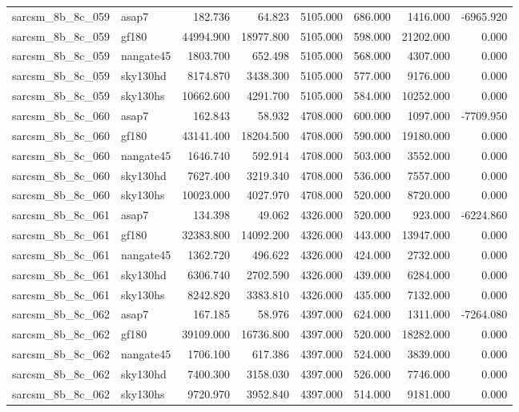 \begin{tabular}{llrrrrrr}
sarcsm\_8b\_8c\_059 & asap7 & 182.736 & 64.823 & 5105.000 & 686.000 & 1416.000 & -6965.920 \\
sarcsm\_8b\_8c\_059 & gf180 & 44994.900 & 18977.800 & 5105.000 & 598.000 & 21202.000 & 0.000 \\
sarcsm\_8b\_8c\_059 & nangate45 & 1803.700 & 652.498 & 5105.000 & 568.000 & 4307.000 & 0.000 \\
sarcsm\_8b\_8c\_059 & sky130hd & 8174.870 & 3438.300 & 5105.000 & 577.000 & 9176.000 & 0.000 \\
sarcsm\_8b\_8c\_059 & sky130hs & 10662.600 & 4291.700 & 5105.000 & 584.000 & 10252.000 & 0.000 \\
sarcsm\_8b\_8c\_060 & asap7 & 162.843 & 58.932 & 4708.000 & 600.000 & 1097.000 & -7709.950 \\
sarcsm\_8b\_8c\_060 & gf180 & 43141.400 & 18204.500 & 4708.000 & 590.000 & 19180.000 & 0.000 \\
sarcsm\_8b\_8c\_060 & nangate45 & 1646.740 & 592.914 & 4708.000 & 503.000 & 3552.000 & 0.000 \\
sarcsm\_8b\_8c\_060 & sky130hd & 7627.400 & 3219.340 & 4708.000 & 536.000 & 7557.000 & 0.000 \\
sarcsm\_8b\_8c\_060 & sky130hs & 10023.000 & 4027.970 & 4708.000 & 520.000 & 8720.000 & 0.000 \\
sarcsm\_8b\_8c\_061 & asap7 & 134.398 & 49.062 & 4326.000 & 520.000 & 923.000 & -6224.860 \\
sarcsm\_8b\_8c\_061 & gf180 & 32383.800 & 14092.200 & 4326.000 & 443.000 & 13947.000 & 0.000 \\
sarcsm\_8b\_8c\_061 & nangate45 & 1362.720 & 496.622 & 4326.000 & 424.000 & 2732.000 & 0.000 \\
sarcsm\_8b\_8c\_061 & sky130hd & 6306.740 & 2702.590 & 4326.000 & 439.000 & 6284.000 & 0.000 \\
sarcsm\_8b\_8c\_061 & sky130hs & 8242.820 & 3383.810 & 4326.000 & 435.000 & 7132.000 & 0.000 \\
sarcsm\_8b\_8c\_062 & asap7 & 167.185 & 58.976 & 4397.000 & 624.000 & 1311.000 & -7264.080 \\
sarcsm\_8b\_8c\_062 & gf180 & 39109.000 & 16736.800 & 4397.000 & 520.000 & 18282.000 & 0.000 \\
sarcsm\_8b\_8c\_062 & nangate45 & 1706.100 & 617.386 & 4397.000 & 524.000 & 3839.000 & 0.000 \\
sarcsm\_8b\_8c\_062 & sky130hd & 7400.300 & 3158.030 & 4397.000 & 526.000 & 7746.000 & 0.000 \\
sarcsm\_8b\_8c\_062 & sky130hs & 9720.970 & 3952.840 & 4397.000 & 514.000 & 9181.000 & 0.000 \\

\end{tabular}
